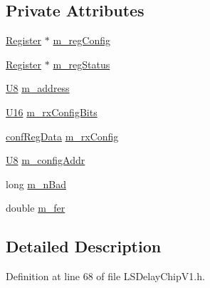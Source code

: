\subsection*{Private Attributes}
\begin{DoxyCompactItemize}
\item 
\hyperlink{classRegister}{Register} $\ast$ \hyperlink{classLSDelayChipV1_afd1cfdcb114549dc1466c77f07d39fe0}{m\_\-regConfig}
\item 
\hyperlink{classRegister}{Register} $\ast$ \hyperlink{classLSDelayChipV1_aaf118f103e89a35d2c449e8e3ffe8c20}{m\_\-regStatus}
\item 
\hyperlink{LSDelayChipV1_8h_a3cb25ca6f51f003950f9625ff05536fc}{U8} \hyperlink{classLSDelayChipV1_a6fba278fd2ac602c796b5e5cebf2d2de}{m\_\-address}
\item 
\hyperlink{LSDelayChipV1_8h_adf928e51a60dba0df29d615401cc55a8}{U16} \hyperlink{classLSDelayChipV1_ae049797212539b231b9722ae69a0491d}{m\_\-rxConfigBits}
\item 
\hyperlink{structconfRegData}{confRegData} \hyperlink{classLSDelayChipV1_a4818ac5c0d7ccf2845a01226234bdb67}{m\_\-rxConfig}
\item 
\hyperlink{LSDelayChipV1_8h_a3cb25ca6f51f003950f9625ff05536fc}{U8} \hyperlink{classLSDelayChipV1_ab49ac38bf9e7a41ccb89c6725cfcac3a}{m\_\-configAddr}
\item 
long \hyperlink{classLSDelayChipV1_a425c69ef8f3d64d93cb1c86b83bbceec}{m\_\-nBad}
\item 
double \hyperlink{classLSDelayChipV1_a38d35de6a25fb1394ede2f39a4f25a08}{m\_\-fer}
\end{DoxyCompactItemize}


\subsection{Detailed Description}


Definition at line 68 of file LSDelayChipV1.h.

